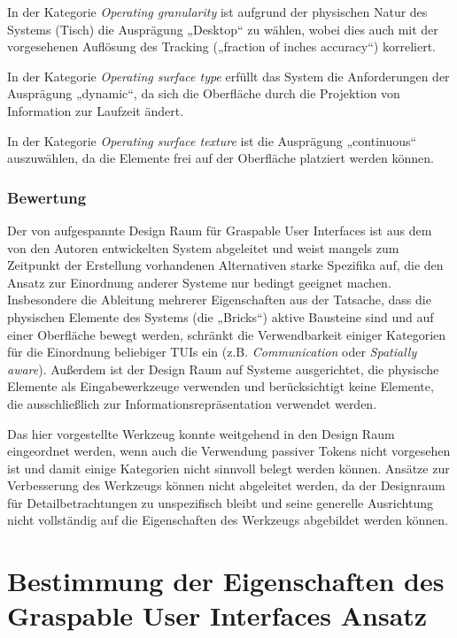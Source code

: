 In der Kategorie \emph{Operating granularity} ist aufgrund der physischen Natur des Systems (Tisch) die Ausprägung „Desktop“ zu wählen, wobei dies auch mit der vorgesehenen Auflösung des Tracking („fraction of inches accuracy“) korreliert.

In der Kategorie \emph{Operating surface type} erfüllt das System die Anforderungen der Ausprägung „dynamic“, da sich die Oberfläche durch die Projektion von Information zur Laufzeit ändert.

In der Kategorie \emph{Operating surface texture} ist die Ausprägung „continuous“ auszuwählen, da die Elemente frei auf der Oberfläche platziert werden können.

\subsubsection{Bewertung}

Der von \citet{Fitzmaurice95} aufgespannte Design Raum für Graspable User Interfaces ist aus dem von den Autoren entwickelten System abgeleitet und weist mangels zum Zeitpunkt der Erstellung vorhandenen Alternativen starke Spezifika auf, die den Ansatz zur Einordnung anderer Systeme nur bedingt geeignet machen. Insbesondere die Ableitung mehrerer Eigenschaften aus der Tatsache, dass die physischen Elemente des Systems (die „Bricks“) aktive Bausteine sind und auf einer Oberfläche bewegt werden, schränkt die Verwendbarkeit einiger Kategorien für die Einordnung beliebiger \glspl{TUI} ein (z.B. \emph{Communication} oder \emph{Spatially aware}). Außerdem ist der Design Raum auf Systeme ausgerichtet, die physische Elemente als Eingabewerkzeuge verwenden und berücksichtigt keine Elemente, die ausschließlich zur Informationsrepräsentation verwendet werden.

Das hier vorgestellte Werkzeug konnte weitgehend in den Design Raum eingeordnet werden, wenn auch die Verwendung passiver Tokens nicht vorgesehen ist und damit einige Kategorien nicht sinnvoll belegt werden können. Ansätze zur Verbesserung des Werkzeugs können nicht abgeleitet werden, da der Designraum für Detailbetrachtungen zu unspezifisch bleibt und seine generelle Ausrichtung nicht vollständig auf die Eigenschaften des Werkzeugs abgebildet werden können.


\section{Bestimmung der Eigenschaften des Graspable User Interfaces Ansatz} %
\label{sec:bestimmung_der_eigenschaften_des_graspable_user_interfaces_ansatz}


